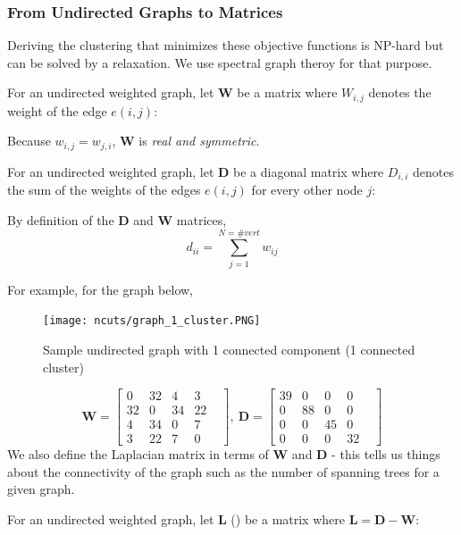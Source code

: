 \documentclass[a4paper]{article}
\begin{document}
\subsubsection{From Undirected Graphs to Matrices}
Deriving the clustering that minimizes these objective functions is NP-hard but can be solved by a relaxation. We use spectral graph theroy for that purpose. 
\begin{definition}
For an undirected weighted graph, let \textbf{W} be a matrix where $W_{i,j}$ denotes the weight of the edge $e(i,j)$:
\end{definition}
Because $w_{i,j} = w_{j,i}$, \textbf{W} is \textit{real and symmetric}.
\begin{definition}
For an undirected weighted graph, let $\textbf{D}$ be a diagonal matrix where $D_{i,i}$ denotes the sum of the weights of the edges $e(i,j)$ for every other node $j$:
\end{definition}
\begin{corollary}
By definition of the $\textbf{D}$ and $\textbf{W}$ matrices,
\[
{{d}_{ii}}=\sum\limits_{j=1}^{N=\#vert}{{{w}_{ij}}}
\]
\end{corollary}
For example, for the graph below, 
\begin{figure}[H]
	\centering %
    	\texttt{[image: ncuts/graph\_1\_cluster.PNG]}
    \caption{Sample undirected graph with 1 connected component (1 connected cluster)}
    \label{fig:undir_graph_1_cluster}
\end{figure}
\[
\textbf{W} = \begin{bmatrix}
0 & 32& 4& 3\\
32 & 0 &34 & 22&\\
4& 34& 0 &7\\
3& 22& 7& 0
\end{bmatrix},\
\textbf{D} = 
\begin{bmatrix}
39 & 0& 0& 0\\
0& 88 &0 & 0&\\
0& 0& 45 &0\\
0& 0& 0& 32
\end{bmatrix}
\]
We also define the Laplacian matrix in terms of $\textbf{W}$ and $\textbf{D}$ - this tells us things about the connectivity of the graph such as the number of spanning trees for a given graph.
\begin{definition}
For an undirected weighted graph, let \textbf{L} () be a matrix where $\textbf{L} = \textbf{D}-\textbf{W}$:
\end{definition}
\end{document}
